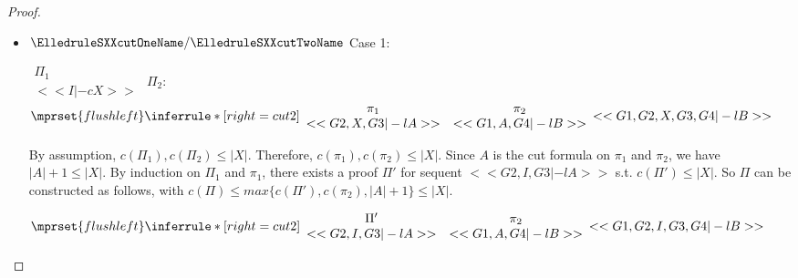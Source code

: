 \begin{proof}
\begin{enumerate}
\begin{itemize}
    \item $\ElledruleSXXcutOneName/\ElledruleSXXcutTwoName$ Case 1:
      \begin{center}
        \scriptsize
        \begin{math}
          \begin{array}{c}
            \Pi_1 \\
            {<<I |-c X>>}
          \end{array}
        \end{math}
        \qquad\qquad
        $\Pi_2:$
        \begin{math}
          $$\mprset{flushleft}
          \inferrule* [right={\tiny cut2}] {
            {
              \begin{array}{cc}
                \pi_1 & \pi_2 \\
                {<<G2, X, G3 |-l A>>} & {<<G1, A, G4 |-l B>>}
              \end{array}
            }
          }{<<G1, G2, X, G3, G4 |-l B>>}
        \end{math}
      \end{center}
      By assumption, $c(\Pi_1),c(\Pi_2)\leq |X|$. Therefore, $c(\pi_1),c(\pi_2)\leq |X|$.
      Since $A$ is the cut formula on $\pi_1$ and $\pi_2$, we have $|A|+1\leq|X|$. By
      induction on $\Pi_1$ and $\pi_1$, there exists a proof $\Pi'$ for sequent
      $<<G2, I, G3 |-l A>>$ s.t. $c(\Pi')\leq|X|$. So $\Pi$ can be constructed as follows,
      with $c(\Pi)\leq max\{c(\Pi'),c(\pi_2),|A|+1\}\leq |X|$.
      \begin{center}
        \scriptsize
        \begin{math}
          $$\mprset{flushleft}
          \inferrule* [right={\tiny cut2}] {
            {
              \begin{array}{cc}
                \Pi' & \pi_2 \\
                {<<G2, I, G3 |-l A>>} & {<<G1, A, G4 |-l B>>}
              \end{array}
            }
          }{<<G1, G2, I, G3, G4 |-l B>>}
        \end{math}
      \end{center}


\end{itemize}
\end{enumerate}
\end{proof}

